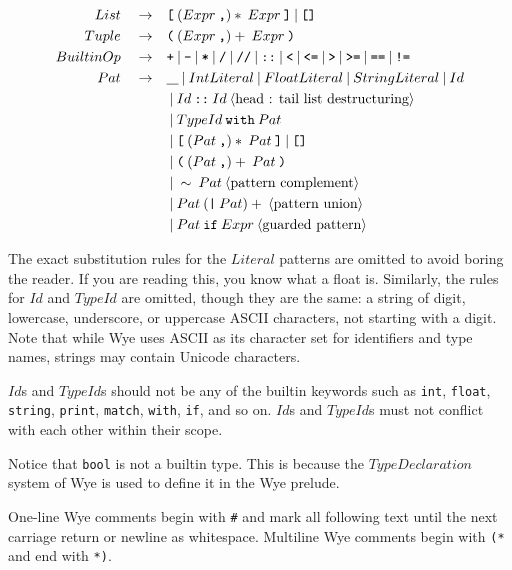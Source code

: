 \documentclass[a4paper, 12pt]{article}
\newcommand{\sepbar}{\: | \:}	%
\newcommand{\substo}{\quad\rightarrow\quad}
\newcommand{\uscore}{\underline{\hspace{0.3cm}}}
\begin{document}
\begin{align*}
List \substo& \texttt{[}\: (Expr \: \texttt{,})*\: Expr\: \texttt{]} \sepbar \texttt{[]}\\
Tuple \substo& \texttt{(}\: (Expr \: \texttt{,})+\: Expr\: \texttt{)}\\
BuiltinOp \substo& \texttt{+}\sepbar\texttt{-}\sepbar\texttt{*}\sepbar\texttt{/}\sepbar\texttt{//}\sepbar\texttt{::}\sepbar\texttt{<}\sepbar\texttt{<=}\sepbar\texttt{>}\sepbar\texttt{>=}\sepbar\texttt{==}\sepbar\texttt{!=}\\
Pat \substo& \uscore \sepbar IntLiteral\sepbar FloatLiteral\sepbar StringLiteral\sepbar Id \\
& \sepbar Id\:\texttt{::}\: Id\:\langle\text{head : tail list destructuring}\rangle\\
& \sepbar TypeId \: \texttt{with}\: Pat\\
& \sepbar \texttt{[} \: ( Pat\:\texttt{,})*\: Pat \: \texttt{]} \sepbar  \texttt{[]}\\
& \sepbar \texttt{(} \: ( Pat\:\texttt{,})+\: Pat\: \texttt{)}\\
& \sepbar \sim\:Pat \:\langle\text{pattern complement}\rangle\\
& \sepbar Pat\: (\texttt{|}\: Pat)+\:\langle\text{pattern union}\rangle\\
& \sepbar Pat\:\texttt{if}\: Expr\:\langle\text{guarded pattern}\rangle
\end{align*}
\pagebreak

The exact substitution rules for the $Literal$ patterns are omitted to avoid boring the reader. If you are reading this, you know what a float is. Similarly, the rules for $Id$ and $TypeId$ are omitted, though they are the same: a string of digit, lowercase, underscore, or uppercase ASCII characters, not starting with a digit. Note that while Wye uses ASCII as its character set for identifiers and type names, strings may contain Unicode characters.

$Id$s and $TypeId$s should not be any of the builtin keywords such as \texttt{int}, \texttt{float}, \texttt{string}, \texttt{print}, \texttt{match}, \texttt{with}, \texttt{if}, and so on. $Id$s and $TypeId$s must not conflict with each other within their scope.

Notice that \texttt{bool} is not a builtin type. This is because the $TypeDeclaration$ system of Wye is used to define it in the Wye prelude.

One-line Wye comments begin with \texttt{\#} and mark all following text until the next carriage return or newline as whitespace. Multiline Wye comments begin with \texttt{(*} and end with \texttt{*)}.
\end{document}
